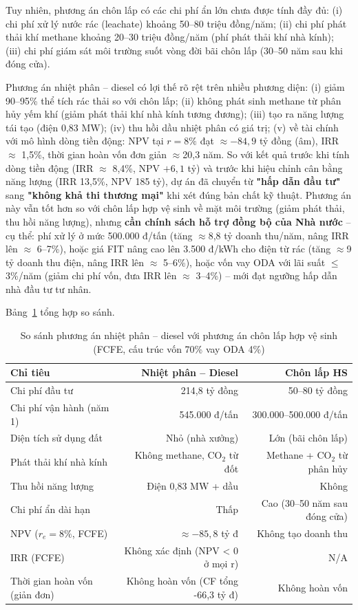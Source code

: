 \documentclass[../main.tex]{subfiles}
\begin{document}
Tuy nhiên, phương án chôn lấp có các chi phí ẩn lớn chưa được tính đầy đủ: (i) chi phí xử lý nước rác (leachate) khoảng 50--80 triệu đồng/năm; (ii) chi phí phát thải khí methane khoảng 20--30 triệu đồng/năm (phí phát thải khí nhà kính); (iii) chi phí giám sát môi trường suốt vòng đời bãi chôn lấp (30--50 năm sau khi đóng cửa).

Phương án nhiệt phân -- diesel có lợi thế rõ rệt trên nhiều phương diện: (i) giảm 90--95\% thể tích rác thải so với chôn lấp; (ii) không phát sinh methane từ phân hủy yếm khí (giảm phát thải khí nhà kính tương đương); (iii) tạo ra năng lượng tái tạo (điện 0,83 MW); (iv) thu hồi dầu nhiệt phân có giá trị; (v) về tài chính với mô hình dòng tiền động: NPV tại $r = 8\%$ đạt $\approx$$-84{,}9$ tỷ đồng (âm), IRR $\approx$ 1,5\%, thời gian hoàn vốn đơn giản $\approx$20,3 năm. So với kết quả trước khi tính dòng tiền động (IRR $\approx$ 8,4\%, NPV $+6{,}1$ tỷ) và trước khi hiệu chỉnh cân bằng năng lượng (IRR 13,5\%, NPV 185 tỷ), dự án đã chuyển từ \textbf{"hấp dẫn đầu tư"} sang \textbf{"không khả thi thương mại"} khi xét đúng bản chất kỹ thuật. Phương án này vẫn tốt hơn so với chôn lấp hợp vệ sinh về mặt môi trường (giảm phát thải, thu hồi năng lượng), nhưng \textbf{cần chính sách hỗ trợ đồng bộ của Nhà nước} -- cụ thể: phí xử lý ở mức 500.000 đ/tấn (tăng $\approx$8,8 tỷ doanh thu/năm, nâng IRR lên $\approx$ 6--7\%), hoặc giá FIT nâng cao lên 3.500 đ/kWh cho điện từ rác (tăng $\approx$9 tỷ doanh thu điện, nâng IRR lên $\approx$ 5--6\%), hoặc vốn vay ODA với lãi suất $\leq$ 3\%/năm (giảm chi phí vốn, đưa IRR lên $\approx$ 3--4\%) -- mới đạt ngưỡng hấp dẫn nhà đầu tư tư nhân.

Bảng~\ref{tab:so-sanh-chon-lap} tổng hợp so sánh.

\begin{table}[H]
\caption{So sánh phương án nhiệt phân -- diesel với phương án chôn lấp hợp vệ sinh (FCFE, cấu trúc vốn 70\% vay ODA 4\%)}
\label{tab:so-sanh-chon-lap}
\centering
\begin{tabular}{p{3.5cm} r r}
\toprule
\textbf{Chỉ tiêu} & \textbf{Nhiệt phân -- Diesel} & \textbf{Chôn lấp HS} \\
\midrule
Chi phí đầu tư & 214,8 tỷ đồng & 50--80 tỷ đồng \\
Chi phí vận hành (năm 1) & 545.000 đ/tấn & 300.000--500.000 đ/tấn \\
Diện tích sử dụng đất & Nhỏ (nhà xưởng) & Lớn (bãi chôn lấp) \\
Phát thải khí nhà kính & Không methane, CO$_2$ từ đốt & Methane + CO$_2$ từ phân hủy \\
Thu hồi năng lượng & Điện 0,83 MW + dầu & Không \\
Chi phí ẩn dài hạn & Thấp & Cao (30--50 năm sau đóng cửa) \\
NPV ($r_e = 8\%$, FCFE) & $\approx -85{,}8$ tỷ đ & Không tạo doanh thu \\
IRR (FCFE) & Không xác định (NPV < 0 ở mọi r) & N/A \\
Thời gian hoàn vốn (giản đơn) & Không hoàn vốn (CF tổng -66,3 tỷ đ) & Không hoàn vốn \\
\end{tabular}
\end{table}
\end{document}
